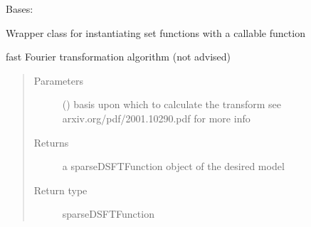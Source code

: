 \documentclass[letterpaper,10pt,english]{sphinxmanual}
\begin{document}
\begin{fulllineitems}
\label{\detokenize{setFTs:setFTs.setfunctions.WrapSetFunction}}
\sphinxAtStartPar
Bases: {\hyperref[\detokenize{setFTs:setFTs.setfunctions.SetFunction}]{}}

\sphinxAtStartPar
Wrapper class for instantiating set functions with a callable function

\begin{fulllineitems}
\label{\detokenize{setFTs:setFTs.setfunctions.WrapSetFunction.transform_fast}}
\sphinxAtStartPar
fast Fourier transformation algorithm (not advised)
\begin{quote}\begin{description}
\item[{Parameters}] \leavevmode
\sphinxAtStartPar
{} () \textendash{} basis upon which to calculate the transform see arxiv.org/pdf/2001.10290.pdf for more info

\item[{Returns}] \leavevmode
\sphinxAtStartPar
a sparseDSFTFunction object of the desired model

\item[{Return type}] \leavevmode
\sphinxAtStartPar
sparseDSFTFunction

\end{description}\end{quote}


\end{fulllineitems}
\end{fulllineitems}
\end{document}
